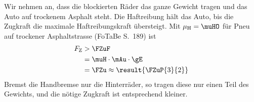 \begin{center}
\end{center}

Wir nehmen an, dass die blockierten Räder das ganze Gewicht tragen und das Auto auf trockenem Asphalt steht. Die Haftreibung hält das Auto, bis die Zugkraft die maximale Haftreibungskraft übersteigt. Mit $\mu_\mathrm{H} = \muHO$ für Pneu auf trockener Asphaltstrasse (FoTaBe S.~189) ist
\begin{align}
 F_\mathrm{Z} &> \FZuF \\
   &= \muH\cdot\mAu\cdot\gE \\
   &= \FZu \approx \result{\FZuP{3}{2}}
\end{align}
Bremst die Handbremse nur die Hinterräder, so tragen diese nur einen Teil des Gewichts, und die nötige Zugkraft ist entsprechend kleiner.
